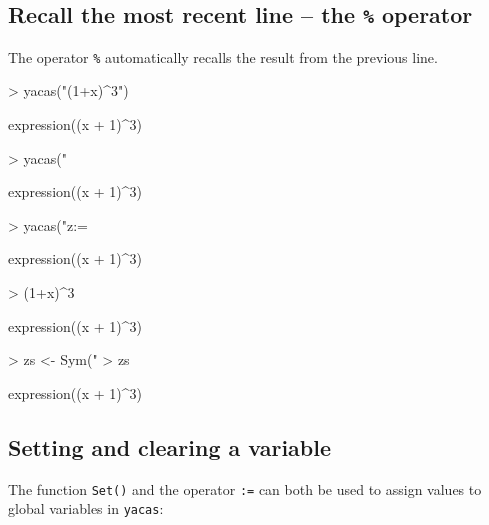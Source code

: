 \documentclass[10pt]{article}
\newcommand{\yacas}{{\tt yacas}}
\newcommand{\code}[1]{{\tt #1}}
\begin{document}
\subsection{Recall the most recent line -- the \texttt{\%} operator}

The operator \texttt{\%} automatically recalls the result from the
previous line.
\begin{Schunk}
\begin{Sinput}
> yacas("(1+x)^3")
\end{Sinput}
\begin{Soutput}
expression((x + 1)^3)
\end{Soutput}
\begin{Sinput}
> yacas("%")
\end{Sinput}
\begin{Soutput}
expression((x + 1)^3)
\end{Soutput}
\begin{Sinput}
> yacas("z:= %")
\end{Sinput}
\begin{Soutput}
expression((x + 1)^3)
\end{Soutput}
\end{Schunk}

\begin{Schunk}
\begin{Sinput}
> (1+x)^3
\end{Sinput}
\begin{Soutput}
expression((x + 1)^3)
\end{Soutput}
\begin{Sinput}
> zs <- Sym("%")
> zs
\end{Sinput}
\begin{Soutput}
expression((x + 1)^3)
\end{Soutput}
\end{Schunk}


\subsection{Setting and clearing a variable}
\label{sec:setting-clearing}

The function \code{Set()} and the operator \code{:=} can both be used
to assign values to global variables in \yacas:
\end{document}
